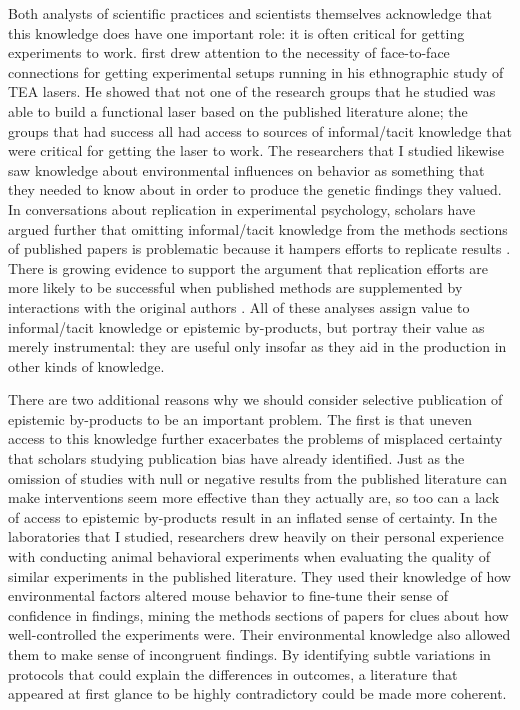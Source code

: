\documentclass[twocolumn, serif, meta, authordate]{jote-article}
\begin{document}
Both analysts of scientific practices and scientists themselves acknowledge that this knowledge does have one important role: it is often critical for getting experiments to work. \textcite{Collins1974}
first drew attention to the necessity of face-to-face connections for getting experimental setups running in his ethnographic study of TEA lasers. He showed that not one of the research groups that he studied was able to build a functional laser based on the published literature alone; the groups that had success all had access to sources of informal/tacit knowledge that were critical for getting the laser to work. The researchers that I studied likewise saw knowledge about environmental influences on behavior as something that they needed to know about in order to produce the genetic findings they valued. In conversations about replication in experimental psychology, scholars have argued further that omitting informal/tacit knowledge from the methods sections of published papers is problematic because it hampers efforts to replicate results \parencite{Brenninkmeijer2019}. There is growing evidence to support the argument that replication efforts are more likely to be successful when published methods are supplemented by interactions with the original authors \parencite{Chatard2020, Klein2019}. All of these analyses assign value to informal/tacit knowledge or epistemic by-products, but portray their value as merely instrumental: they are useful only insofar as they aid in the production in other kinds of knowledge.

There are two additional reasons why we should consider selective publication of epistemic by-products to be an important problem. The first is that uneven access to this knowledge further exacerbates the problems of misplaced certainty that scholars studying publication bias have already identified. Just as the omission of studies with null or negative results from the published literature can make interventions seem more effective than they actually are, so too can a lack of access to epistemic by-products result in an inflated sense of certainty. In the laboratories that I studied, researchers drew heavily on their personal experience with conducting animal behavioral experiments when evaluating the quality of similar experiments in the published literature. They used their knowledge of how environmental factors altered mouse behavior to fine-tune their sense of confidence in findings, mining the methods sections of papers for clues about how well-controlled the experiments were. Their environmental knowledge also allowed them to make sense of incongruent findings. By identifying subtle variations in protocols that could explain the differences in outcomes, a literature that appeared at first glance to be highly contradictory could be made more coherent.
\end{document}
